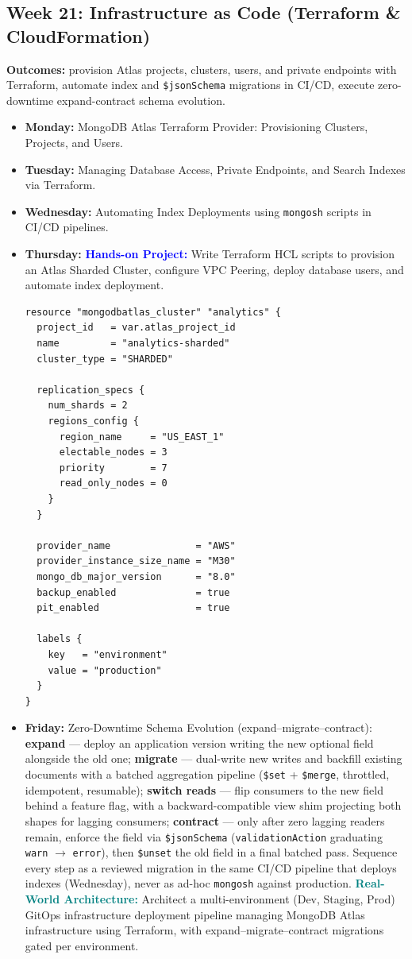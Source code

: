 \documentclass[11pt, a4paper]{article}
\newcommand{\project}[1]{\textbf{\textcolor{blue}{Hands-on Project:}} #1}
\newcommand{\usecase}[1]{\textbf{\textcolor{teal}{Real-World Architecture:}} #1}
\newcommand{\dayitem}[2]{\item \textbf{#1:} #2}
\begin{document}
\subsection*{Week 21: Infrastructure as Code (Terraform \& CloudFormation)}
\par\noindent\textbf{Outcomes:} provision Atlas projects, clusters, users, and private endpoints with Terraform, automate index and \texttt{\$jsonSchema} migrations in CI/CD, execute zero-downtime expand-contract schema evolution.
\begin{itemize}[label=-]
    \dayitem{Monday}{MongoDB Atlas Terraform Provider: Provisioning Clusters, Projects, and Users.}
    \dayitem{Tuesday}{Managing Database Access, Private Endpoints, and Search Indexes via Terraform.}
    \dayitem{Wednesday}{Automating Index Deployments using \texttt{mongosh} scripts in CI/CD pipelines.}
    \dayitem{Thursday}{\project{Write Terraform HCL scripts to provision an Atlas Sharded Cluster, configure VPC Peering, deploy database users, and automate index deployment.}}
\begin{lstlisting}
resource "mongodbatlas_cluster" "analytics" {
  project_id   = var.atlas_project_id
  name         = "analytics-sharded"
  cluster_type = "SHARDED"

  replication_specs {
    num_shards = 2
    regions_config {
      region_name     = "US_EAST_1"
      electable_nodes = 3
      priority        = 7
      read_only_nodes = 0
    }
  }

  provider_name               = "AWS"
  provider_instance_size_name = "M30"
  mongo_db_major_version      = "8.0"
  backup_enabled              = true
  pit_enabled                 = true

  labels {
    key   = "environment"
    value = "production"
  }
}
\end{lstlisting}
    \dayitem{Friday}{Zero-Downtime Schema Evolution (expand--migrate--contract): \textbf{expand} --- deploy an application version writing the new optional field alongside the old one; \textbf{migrate} --- dual-write new writes and backfill existing documents with a batched aggregation pipeline (\texttt{\$set} + \texttt{\$merge}, throttled, idempotent, resumable); \textbf{switch reads} --- flip consumers to the new field behind a feature flag, with a backward-compatible view shim projecting both shapes for lagging consumers; \textbf{contract} --- only after zero lagging readers remain, enforce the field via \texttt{\$jsonSchema} (\texttt{validationAction} graduating \texttt{warn} $\to$ \texttt{error}), then \texttt{\$unset} the old field in a final batched pass. Sequence every step as a reviewed migration in the same CI/CD pipeline that deploys indexes (Wednesday), never as ad-hoc \texttt{mongosh} against production. \usecase{Architect a multi-environment (Dev, Staging, Prod) GitOps infrastructure deployment pipeline managing MongoDB Atlas infrastructure using Terraform, with expand--migrate--contract migrations gated per environment.}}
\end{itemize}
\end{document}
